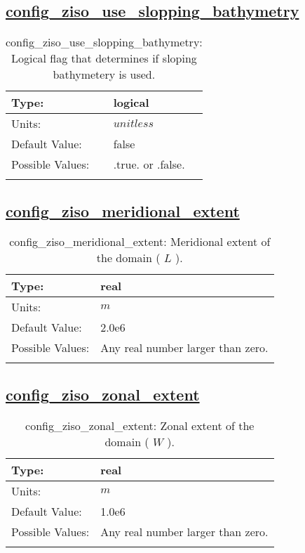 \subsection[config\_ziso\_use\_slopping\_bathymetry]{\hyperref[sec:nm_tab_ziso]{config\_ziso\_use\_slopping\_bathymetry}}
\label{subsec:nm_sec_config_ziso_use_slopping_bathymetry}
\begin{center}
\begin{longtable}{| p{2.0in} || p{4.0in} |}
    \hline
    Type: & logical \\
    \hline
    Units: & $unitless$ \\
    \hline
    Default Value: & false \\
    \hline
    Possible Values: & .true. or .false. \\
    \hline
    \caption{config\_ziso\_use\_slopping\_bathymetry: Logical flag that determines if sloping bathymetery is used.}
\end{longtable}
\end{center}
\subsection[config\_ziso\_meridional\_extent]{\hyperref[sec:nm_tab_ziso]{config\_ziso\_meridional\_extent}}
\label{subsec:nm_sec_config_ziso_meridional_extent}
\begin{center}
\begin{longtable}{| p{2.0in} || p{4.0in} |}
    \hline
    Type: & real \\
    \hline
    Units: & $m$ \\
    \hline
    Default Value: & 2.0e6 \\
    \hline
    Possible Values: & Any real number larger than zero. \\
    \hline
    \caption{config\_ziso\_meridional\_extent:  Meridional extent of the domain ( $L$ ).}
\end{longtable}
\end{center}
\subsection[config\_ziso\_zonal\_extent]{\hyperref[sec:nm_tab_ziso]{config\_ziso\_zonal\_extent}}
\label{subsec:nm_sec_config_ziso_zonal_extent}
\begin{center}
\begin{longtable}{| p{2.0in} || p{4.0in} |}
    \hline
    Type: & real \\
    \hline
    Units: & $m$ \\
    \hline
    Default Value: & 1.0e6 \\
    \hline
    Possible Values: & Any real number larger than zero. \\
    \hline
    \caption{config\_ziso\_zonal\_extent:  Zonal extent of the domain ( $W$ ).}
\end{longtable}
\end{center}
